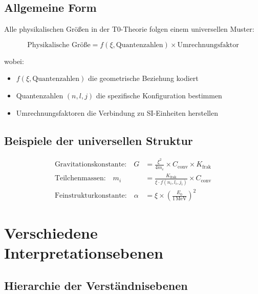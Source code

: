 	\subsection{Allgemeine Form}
	
	Alle physikalischen Größen in der T0-Theorie folgen einem universellen Muster:
	
	\begin{equation}
		\boxed{\text{Physikalische Größe} = f(\xi, \text{Quantenzahlen}) \times \text{Umrechnungsfaktor}}
		\label{eq:universal_pattern}
	\end{equation}
	
	wobei:
	\begin{itemize}
		\item $f(\xi, \text{Quantenzahlen})$ die geometrische Beziehung kodiert
		\item Quantenzahlen $(n,l,j)$ die spezifische Konfiguration bestimmen
		\item Umrechnungsfaktoren die Verbindung zu SI-Einheiten herstellen
	\end{itemize}
	
	\subsection{Beispiele der universellen Struktur}
	
	\begin{align}
		\text{Gravitationskonstante:} \quad G &= \frac{\xi^2}{4m_e} \times C_{\text{conv}} \times K_{\text{frak}} \\
		\text{Teilchenmassen:} \quad m_i &= \frac{K_{\text{frak}}}{\xi \cdot f(n_i,l_i,j_i)} \times C_{\text{conv}} \\
		\text{Feinstrukturkonstante:} \quad \alpha &= \xi \times \left(\frac{E_0}{1\,\mathrm{MeV}}\right)^2
	\end{align}
	
	\section{Verschiedene Interpretationsebenen}
	
	\subsection{Hierarchie der Verständnisebenen}
	
